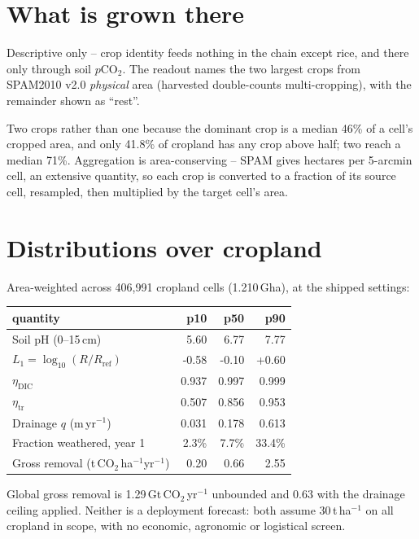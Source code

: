 \documentclass[11pt,a4paper]{article}
\newcommand{\cotwo}{\ensuremath{\mathrm{CO_2}}}
\begin{document}
\section{What is grown there}

Descriptive only -- crop identity feeds nothing in the chain except rice, and
there only through soil $p$\cotwo{}. The readout names the two largest crops from
SPAM2010 v2.0 \emph{physical} area (harvested double-counts multi-cropping), with
the remainder shown as ``rest''.

Two crops rather than one because the dominant crop is a median
46\% of a cell's cropped area, and only 41.8\% of
cropland has any crop above half; two reach a median 71\%. Aggregation is area-conserving -- SPAM gives hectares per 5-arcmin
cell, an extensive quantity, so each crop is converted to a fraction of its source
cell, resampled, then multiplied by the target cell's area.

\section{Distributions over cropland}

Area-weighted across 406,991 cropland cells
(1.210\,Gha), at the shipped settings:

\begin{center}\small
\begin{tabular}{lrrr}
\toprule
quantity & p10 & p50 & p90 \\
\midrule
Soil pH (0--15\,cm) & 5.60 & 6.77 & 7.77 \\
$L_1 = \log_{10}(R/R_{\mathrm{ref}})$ & -0.58 & -0.10 & +0.60 \\
$\eta_{\mathrm{DIC}}$ & 0.937 & 0.997 & 0.999 \\
$\eta_{\mathrm{tr}}$ & 0.507 & 0.856 & 0.953 \\
Drainage $q$ (m\,yr$^{-1}$) & 0.031 & 0.178 & 0.613 \\
Fraction weathered, year 1 & 2.3\% & 7.7\% & 33.4\% \\
Gross removal (t\,\cotwo{}\,ha$^{-1}$yr$^{-1}$) & 0.20 & 0.66 & 2.55 \\
\bottomrule
\end{tabular}
\end{center}

Global gross removal is 1.29\,Gt\,\cotwo{}\,yr$^{-1}$ unbounded and
0.63 with the drainage ceiling applied. Neither is a deployment forecast:
both assume 30\,t\,ha$^{-1}$ on all cropland in scope, with no economic,
agronomic or logistical screen.
\end{document}
